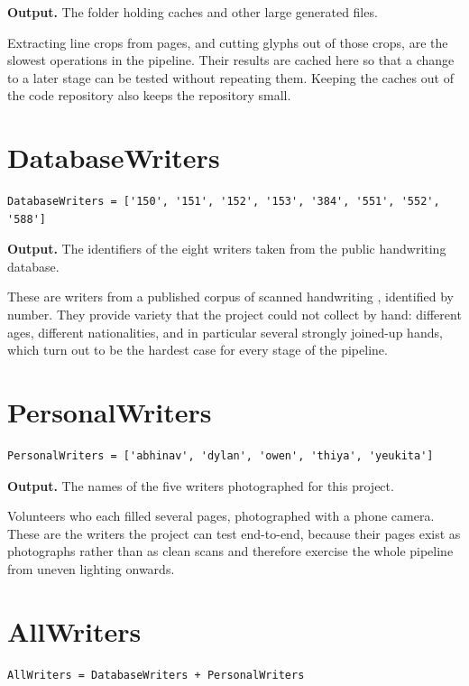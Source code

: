 \noindent\textbf{Output.} The folder holding caches and other large generated files.

Extracting line crops from pages, and cutting glyphs out of those crops, are the slowest operations in the pipeline. Their results are cached here so that a change to a later stage can be tested without repeating them. Keeping the caches out of the code repository also keeps the repository small.


\section{DatabaseWriters}
\begin{lstlisting}[style=sig]
DatabaseWriters = ['150', '151', '152', '153', '384', '551', '552', '588']
\end{lstlisting}

\noindent\textbf{Output.} The identifiers of the eight writers taken from the public handwriting database.

These are writers from a published corpus of scanned handwriting \cite{marti2002}, identified by number. They provide variety that the project could not collect by hand: different ages, different nationalities, and in particular several strongly joined-up hands, which turn out to be the hardest case for every stage of the pipeline.


\section{PersonalWriters}
\begin{lstlisting}[style=sig]
PersonalWriters = ['abhinav', 'dylan', 'owen', 'thiya', 'yeukita']
\end{lstlisting}

\noindent\textbf{Output.} The names of the five writers photographed for this project.

Volunteers who each filled several pages, photographed with a phone camera. These are the writers the project can test end-to-end, because their pages exist as photographs rather than as clean scans and therefore exercise the whole pipeline from uneven lighting onwards.


\section{AllWriters}
\begin{lstlisting}[style=sig]
AllWriters = DatabaseWriters + PersonalWriters
\end{lstlisting}

